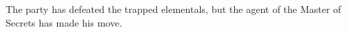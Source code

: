 The party has defeated the trapped elementals, but the agent of the Master of Secrets has made his move.
